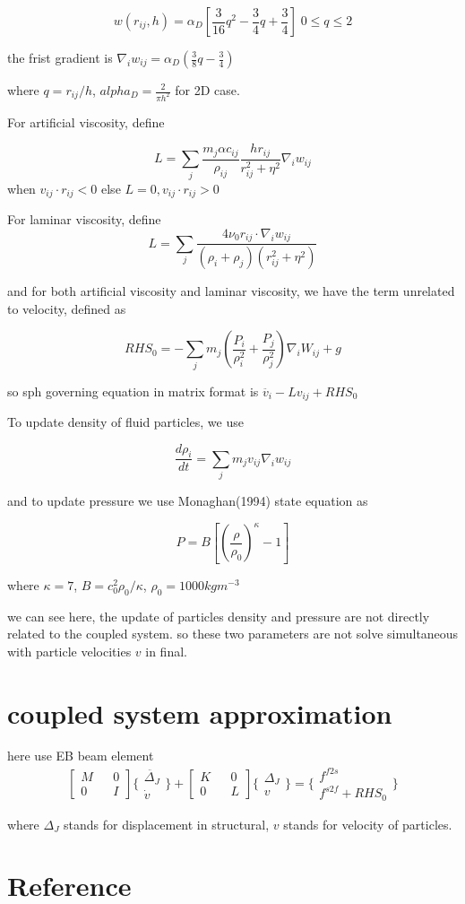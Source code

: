 \documentclass[11pt]{article}
\begin{document}
$$w(r_{ij},h)  = \alpha_D [ \frac{3}{16} q^2 - \frac{3}{4} q + \frac{3}{4}] \; 0 \leq q \leq 2 $$

the frist gradient is $ \nabla_i w_{ij} = \alpha_D (\frac{3}{8} q - \frac{3}{4})$

where $ q= r_{ij}/h $, $alpha_D = \frac{2}{\pi h^2}$ for 2D case.

For artificial viscosity, define

$$ L = \sum_j \frac{m_j \alpha c_{ij}}{\rho _ {ij}} \frac{h r_{ij}}{r_{ij}^2 + \eta^2} \nabla_i w_{ij}$$ when $ v_{ij} \cdot r_{ij} < 0 $ else $ L =0 ,  v_{ij} \cdot r_{ij} > 0$

For laminar viscosity, define
$$ L = \sum_{j} \frac{4 \nu_0 r_{ij} \cdot \nabla_i w_{ij}}{(\rho_i + \rho_j)(r_{ij}^2+\eta^2)} $$ 

and for both artificial viscosity and laminar viscosity, we have the term unrelated to velocity, defined as

$$ RHS_0 =  - \sum_{j} m_j (\frac{P_i}{\rho _i ^2} + \frac{P_j}{\rho_j ^2}) \nabla_i W_{ij} + g $$

so sph governing equation in matrix format is 
$ \ddot{v_i} - L v_{ij} + RHS_0 $


To update density of fluid particles, we use 

$$ \frac{d \rho_i}{dt} = \sum_j m_j v_{ij} \nabla_i w_{ij} $$

and to update pressure we use Monaghan(1994) state equation as

$$ P = B[ (\frac{\rho}{\rho_0})^ \kappa - 1] $$

where $\kappa = 7$, $B= c_0^2 \rho_0 /\kappa$, $\rho_0 = 1000 kgm^{-3}$ 

we can see here, the update of particles density and pressure are not directly related to the coupled system. so these two parameters are not solve simultaneous with particle velocities $v$ in final.


\section{coupled system approximation}

here use EB beam element
 $$ \begin{bmatrix} M && 0 \\ 0 && I \end{bmatrix} \{ \begin{array}{c} \ddot{\Delta_J} \\ \dot{v} \end{array} \} + \begin{bmatrix} K && 0 \\ 0 && L \end{bmatrix} \{ \begin{array}{c} \Delta_J \\ v \end{array} \} = \{ \begin{array}{c} f^{f2s}\\ f^{s2f}+RHS_0 \end{array} \} $$

where $ \Delta_J$ stands for displacement in structural, $v$ stands for velocity of particles. 

\section{Reference}
% 
\end{document}
